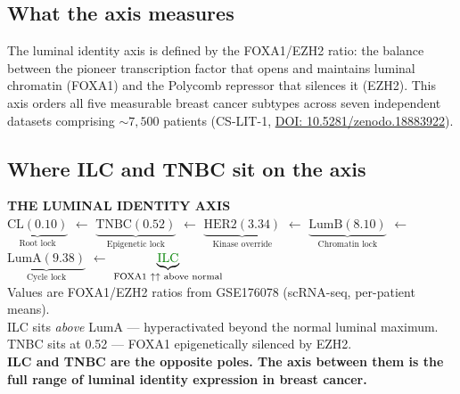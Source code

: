 \documentclass[12pt, a4paper]{article}
\begin{document}
\subsection{What the axis measures}

The luminal identity axis is defined by the
FOXA1/EZH2 ratio: the balance between the pioneer
transcription factor that opens and maintains luminal
chromatin (FOXA1) and the Polycomb repressor that
silences it (EZH2). This axis orders all five
measurable breast cancer subtypes across seven
independent datasets comprising ${\sim}7{,}500$
patients (CS-LIT-1,
\href{https://doi.org/10.5281/zenodo.18883922}
{DOI: 10.5281/zenodo.18883922}).

\subsection{Where ILC and TNBC sit on the axis}

\begin{center}
\colorbox{axisbox}{
\begin{minipage}{0.88\textwidth}
\vspace{0.5em}
\centering
\textbf{THE LUMINAL IDENTITY AXIS}\\[0.6em]
\small
$\underbrace{\text{CL}(0.10)}_{\text{Root lock}}$
\hspace{0.5em}$\leftarrow$\hspace{0.5em}
$\underbrace{\text{TNBC}(0.52)}_{\text{Epigenetic lock}}$
\hspace{0.5em}$\leftarrow$\hspace{0.5em}
$\underbrace{\text{HER2}(3.34)}_{\text{Kinase override}}$
\hspace{0.5em}$\leftarrow$\hspace{0.5em}
$\underbrace{\text{LumB}(8.10)}_{\text{Chromatin lock}}$
\hspace{0.5em}$\leftarrow$\hspace{0.5em}
$\underbrace{\text{LumA}(9.38)}_{\text{Cycle lock}}$
\hspace{0.5em}$\leftarrow$\hspace{0.5em}
$\underbrace{\textcolor{green!50!black}{\text{ILC}}}_{\text{FOXA1 }\uparrow\uparrow\text{ above normal}}$\\[0.6em]
\normalsize
Values are FOXA1/EZH2 ratios from GSE176078
(scRNA-seq, per-patient means).\\
ILC sits \textit{above} LumA --- hyperactivated
beyond the normal luminal maximum.\\
TNBC sits at 0.52 --- FOXA1 epigenetically
silenced by EZH2.\\[0.3em]
\textbf{ILC and TNBC are the opposite poles.
The axis between them is the full range of
luminal identity expression in breast cancer.}
\vspace{0.5em}
\end{minipage}}
\end{center}
\end{document}
